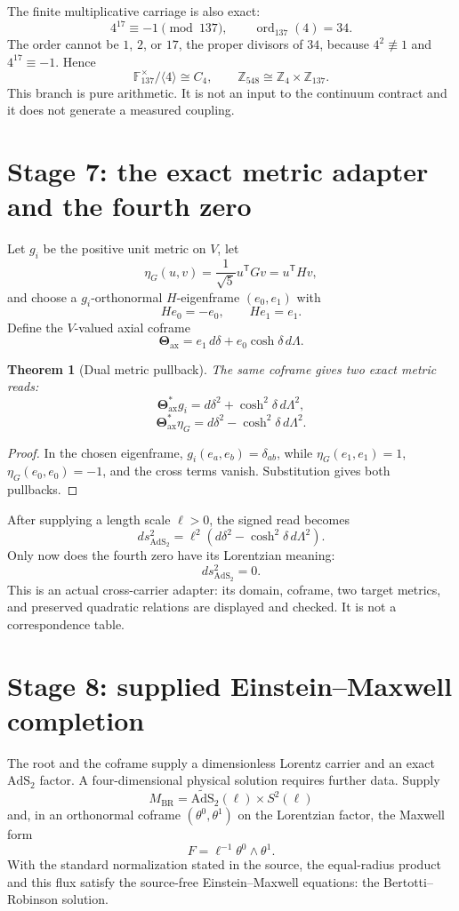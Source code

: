 \documentclass[11pt]{article}
\newtheorem{theorem}{Theorem}[section]
\begin{document}
The finite multiplicative carriage is also exact:
\[
4^{17}\equiv-1\pmod{137},
\qquad
\operatorname{ord}_{137}(4)=34.
\]
The order cannot be $1$, $2$, or $17$, the proper divisors of $34$, because $4^2\not\equiv1$ and $4^{17}\equiv-1$. Hence
\[
\boxed{
\mathbb F_{137}^{\times}/\langle4\rangle\cong C_4,
\qquad
\mathbb Z_{548}\cong\mathbb Z_4\times\mathbb Z_{137}.
}
\]
This branch is pure arithmetic. It is not an input to the continuum contract and it does not generate a measured coupling.

\section{Stage 7: the exact metric adapter and the fourth zero}

Let $g_i$ be the positive unit metric on $V$, let
\[
\eta_G(u,v)=\frac1{\sqrt5}u^{\mathsf T}Gv=u^{\mathsf T}Hv,
\]
and choose a $g_i$-orthonormal $H$-eigenframe $(e_0,e_1)$ with
\[
He_0=-e_0,
\qquad
He_1=e_1.
\]
Define the $V$-valued axial coframe
\[
\boldsymbol\Theta_{\mathrm{ax}}
=e_1\,d\delta+e_0\cosh\delta\,d\Lambda.
\]

\begin{theorem}[Dual metric pullback]
The same coframe gives two exact metric reads:
\[
\boxed{
\boldsymbol\Theta_{\mathrm{ax}}^*g_i
=d\delta^2+\cosh^2\!\delta\,d\Lambda^2,
}
\]
\[
\boxed{
\boldsymbol\Theta_{\mathrm{ax}}^*\eta_G
=d\delta^2-\cosh^2\!\delta\,d\Lambda^2.
}
\]
\end{theorem}
\begin{proof}
In the chosen eigenframe, $g_i(e_a,e_b)=\delta_{ab}$, while $\eta_G(e_1,e_1)=1$, $\eta_G(e_0,e_0)=-1$, and the cross terms vanish. Substitution gives both pullbacks.
\end{proof}

After supplying a length scale $\ell>0$, the signed read becomes
\[
ds_{\mathrm{AdS}_2}^2
=\ell^2\left(d\delta^2-\cosh^2\!\delta\,d\Lambda^2\right).
\]
Only now does the fourth zero have its Lorentzian meaning:
\[
\boxed{ds_{\mathrm{AdS}_2}^2=0.}
\]
This is an actual cross-carrier adapter: its domain, coframe, two target metrics, and preserved quadratic relations are displayed and checked. It is not a correspondence table.

\section{Stage 8: supplied Einstein--Maxwell completion}

The root and the coframe supply a dimensionless Lorentz carrier and an exact $\mathrm{AdS}_2$ factor. A four-dimensional physical solution requires further data. Supply
\[
M_{\mathrm{BR}}=\widetilde{\mathrm{AdS}}_2(\ell)\times S^2(\ell)
\]
and, in an orthonormal coframe $(\theta^0,\theta^1)$ on the Lorentzian factor, the Maxwell form
\[
F=\ell^{-1}\theta^0\wedge\theta^1.
\]
With the standard normalization stated in the source, the equal-radius product and this flux satisfy the source-free Einstein--Maxwell equations: the Bertotti--Robinson solution.
\end{document}
